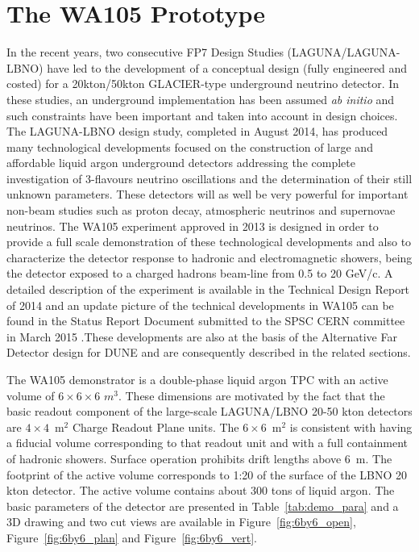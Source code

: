 \section{The WA105 Prototype} 
\label{sec:proto-cern-double}

 In the recent years, two consecutive FP7 Design Studies (LAGUNA/LAGUNA-LBNO) have led to the development
of a conceptual design (fully engineered and costed) for a 20kton/50kton GLACIER-type
underground neutrino detector. In these studies, an underground implementation has been assumed {\it ab initio}
and such constraints have been important and taken into account in design choices. The LAGUNA-LBNO design study, completed in August 2014, has produced many technological developments focused on the construction of  large and affordable liquid argon underground detectors addressing the complete investigation of 3-flavours neutrino oscillations and the determination of their still unknown parameters. These detectors will  as well be very powerful for important non-beam studies such as proton decay, atmospheric neutrinos and supernovae neutrinos. The WA105 experiment approved in 2013 is designed in order to provide a full scale demonstration of these technological developments and also to characterize the detector response to hadronic and electromagnetic showers, being the detector exposed to a charged hadrons beam-line from 0.5 to 20 GeV/c. A detailed description of the experiment is available in the Technical Design Report of 2014  \cite{WA105_TDR} and an update picture of the technical developments in WA105 can be found in the Status Report Document submitted to the SPSC CERN committee in  March 2015 \cite{WA105_SREP}.These developments are also at the basis of the Alternative Far Detector design for DUNE and are consequently described in the related sections.

The WA105 demonstrator is a double-phase liquid argon TPC with an active volume of $6\times 6\times 6$ $m^3$. These dimensions are motivated by the fact that the  basic readout component of the large-scale LAGUNA/LBNO 20-50 kton detectors are $4\times 4$~m$^2$ Charge Readout Plane units. 
The $6\times6$~m$^2$ is consistent with having a fiducial volume corresponding to that readout unit and with a full containment of hadronic showers. 
Surface operation prohibits drift lengths above 6~m. The footprint of the active volume corresponds to 1:20 of the surface of the LBNO 20 kton detector. The active volume contains about 300 tons of liquid argon. The basic parameters of the detector are presented in Table~\ref{tab:demo_para} and a 3D drawing and two cut views are available in Figure~\ref{fig:6by6_open},  Figure~\ref{fig:6by6_plan} and  Figure~\ref{fig:6by6_vert}.

